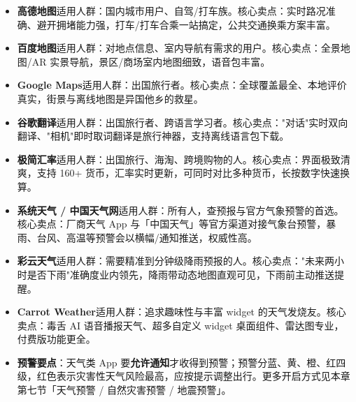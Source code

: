 
\begin{itemize}
  \item \textbf{高德地图}适用人群：国内城市用户、自驾/打车族。核心卖点：实时路况准确、避开拥堵能力强，打车/打车合乘一站搞定，公共交通换乘方案丰富。
  \item \textbf{百度地图}适用人群：对地点信息、室内导航有需求的用户。核心卖点：全景地图/AR 实景导航，景区/商场室内地图细致，语音包丰富。
  \item \textbf{Google Maps}适用人群：出国旅行者。核心卖点：全球覆盖最全、本地评价真实，街景与离线地图是异国他乡的救星。
\end{itemize}


\begin{itemize}
  \item \textbf{谷歌翻译}适用人群：出国旅行者、跨语言学习者。核心卖点："对话"实时双向翻译、"相机"即时取词翻译是旅行神器，支持离线语言包下载。
\end{itemize}


\begin{itemize}
  \item \textbf{极简汇率}适用人群：出国旅行、海淘、跨境购物的人。核心卖点：界面极致清爽，支持 160+ 货币，汇率实时更新，可同时对比多种货币，长按数字快速换算。
\end{itemize}


\begin{itemize}
  \item \textbf{系统天气 / 中国天气网}适用人群：所有人，查预报与官方气象预警的首选。核心卖点：厂商天气 App 与「中国天气」等官方渠道对接气象台预警，暴雨、台风、高温等预警会以横幅/通知推送，权威性高。
  \item \textbf{彩云天气}适用人群：需要精准到分钟级降雨预报的人。核心卖点："未来两小时是否下雨"准确度业内领先，降雨带动态地图直观可见，下雨前主动推送提醒。
  \item \textbf{Carrot Weather}适用人群：追求趣味性与丰富 widget 的天气发烧友。核心卖点：毒舌 AI 语音播报天气、超多自定义 widget 桌面组件、雷达图专业，付费版功能更全。
  \item \textbf{预警要点}：天气类 App 要\textbf{允许通知}才收得到预警；预警分蓝、黄、橙、红四级，红色表示灾害性天气风险最高，应按提示调整出行。更多开启方式见本章第七节「天气预警 / 自然灾害预警 / 地震预警」。
\end{itemize}

